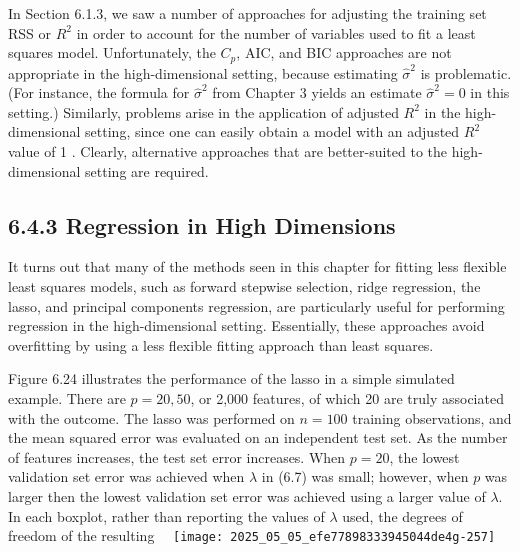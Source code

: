 \documentclass[10pt]{article}
\begin{document}
In Section 6.1.3, we saw a number of approaches for adjusting the training set RSS or $R^{2}$ in order to account for the number of variables used to fit a least squares model. Unfortunately, the $C_{p}$, AIC, and BIC approaches are not appropriate in the high-dimensional setting, because estimating $\hat{\sigma}^{2}$ is problematic. (For instance, the formula for $\hat{\sigma}^{2}$ from Chapter 3 yields an estimate $\hat{\sigma}^{2}=0$ in this setting.) Similarly, problems arise in the application of adjusted $R^{2}$ in the high-dimensional setting, since one can easily obtain a model with an adjusted $R^{2}$ value of 1 . Clearly, alternative approaches that are better-suited to the high-dimensional setting are required.

\subsection*{6.4.3 Regression in High Dimensions}
It turns out that many of the methods seen in this chapter for fitting less flexible least squares models, such as forward stepwise selection, ridge regression, the lasso, and principal components regression, are particularly useful for performing regression in the high-dimensional setting. Essentially, these approaches avoid overfitting by using a less flexible fitting approach than least squares.

Figure 6.24 illustrates the performance of the lasso in a simple simulated example. There are $p=20,50$, or 2,000 features, of which 20 are truly associated with the outcome. The lasso was performed on $n=100$ training observations, and the mean squared error was evaluated on an independent test set. As the number of features increases, the test set error increases. When $p=20$, the lowest validation set error was achieved when $\lambda$ in (6.7) was small; however, when $p$ was larger then the lowest validation set error was achieved using a larger value of $\lambda$. In each boxplot, rather than reporting the values of $\lambda$ used, the degrees of freedom of the resulting\
\
\texttt{[image: 2025\_05\_05\_efe77898333945044de4g-257]}
\end{document}
